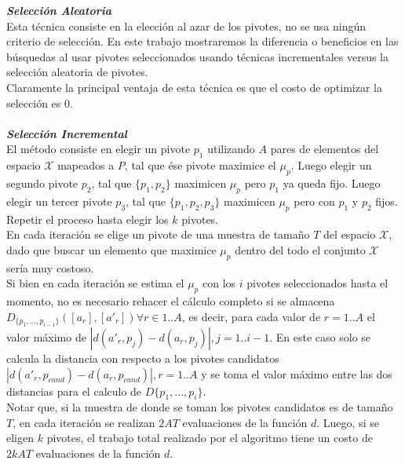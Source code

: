 \noindent \textit{\textbf{Selecci\'on Aleatoria}}\\

Esta t\'ecnica consiste en la elecci\'on al azar de los pivotes, no se usa ning\'un criterio de selecci\'on. En este trabajo mostraremos la diferencia o beneficios en las b\'usquedas al usar pivotes  seleccionados usando t\'ecnicas incrementales versus la selecci\'on aleatoria de pivotes.\\

Claramente la principal ventaja de esta t\'ecnica es que el costo de optimizar la selecci\'on es $0$.\\
 \\
 
\noindent \textit{\textbf{Selecci\'on Incremental}}\\

El m\'etodo consiste en elegir un pivote $p_1$ utilizando $A$ pares de elementos del espacio $\mathcal{X}$ mapeados a $P$, tal que \'ese pivote maximice el $\mu_p$. Luego elegir un segundo pivote $p_2$, tal que $\{p_1,p_2\}$ maximicen $\mu_p$ pero $p_1$ ya queda fijo. Luego elegir un tercer pivote $p_3$, tal que $\{p_1,p_2,p_3\}$  maximicen $\mu_p$ pero con $p_1$ y  $p_2$ fijos. Repetir el proceso hasta elegir los $k$ pivotes.\\

En cada iteraci\'on se elige un pivote de una muestra de tama\~no $T$ del espacio $\mathcal{X}$, dado que buscar un elemento que maximice $\mu_p$ dentro del todo el conjunto $\mathcal{X}$  ser\'ia muy costoso.\\


Si bien en cada iteraci\'on se estima el $\mu_p$ con los $i$ pivotes seleccionados hasta el momento, no es necesario rehacer el c\'alculo completo si se almacena $D_{\{p_1,...,p_{i-1}\}}([a_r],[a'_r]) \forall r \in 1..A$, es decir, para cada valor de $r=1..A$ el valor m\'aximo de $|d(a'_r, p_j) - d(a_r, p_j)|, j = 1..i-1$. En este caso solo se calcula la distancia con respecto a los pivotes candidatos $|d(a'_r, p_{cand}) - d(a_r, p_{cand})|, r = 1..A$ y se toma el valor m\'aximo entre las dos distancias para el calculo de $D\{p_1, ...,p_i\}$.\\

Notar que, si la muestra de donde se toman los pivotes candidatos es de tama\~no $T$, en cada iteraci\'on se realizan $2AT$ evaluaciones de la funci\'on $d$. Luego, si se eligen $k$ pivotes, el trabajo total realizado por el algoritmo tiene un costo de $2kAT$ evaluaciones de la funci\'on $d$.\\